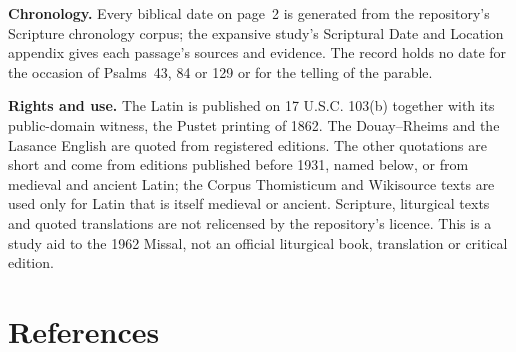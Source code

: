 {\textbf{Chronology.} Every biblical date on page~2 is generated from the
repository's Scripture chronology corpus; the expansive study's Scriptural
Date and Location appendix gives each passage's sources and evidence. The
record holds no date for the occasion of Psalms~43, 84
or 129 or for the telling of the parable.

\textbf{Rights and use.} The Latin is published on 17 U.S.C. 103(b) together
with its public-domain witness, the Pustet printing of 1862. The Douay--Rheims
and the Lasance English are quoted from registered editions. The other
quotations are short and come from editions published before 1931, named
below, or from medieval and ancient Latin; the Corpus Thomisticum and
Wikisource texts are used only for Latin that is itself medieval or
ancient. Scripture, liturgical texts and quoted translations are
not relicensed by the repository's licence. This is a study aid to the 1962
Missal, not an official liturgical book, translation or critical edition.
\par}

\section{References}

